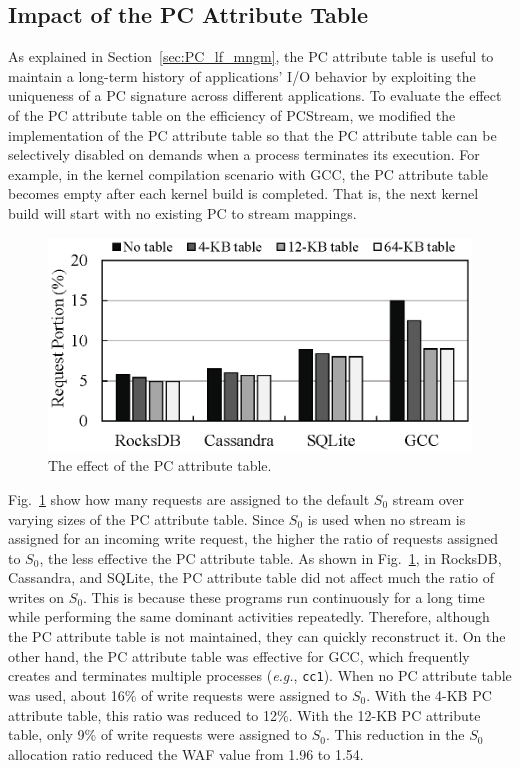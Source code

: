 \subsection{Impact of the PC Attribute Table}
As explained in Section~\ref{sec:PC_lf_mngm}, the PC attribute table is useful to maintain a
long-term history of applications' I/O behavior by exploiting the uniqueness of
a PC signature across different applications.   To evaluate the effect of the
PC attribute table on the efficiency of \textsf{\small PCStream}, we modified
the implementation of the PC attribute table so that the PC attribute table can
be selectively disabled on demands when a process terminates its execution.
For example, in the kernel compilation scenario with GCC, the PC attribute
table becomes empty after each kernel build is completed.  That is, the next
kernel build will start with no existing PC to stream mappings.


\begin{figure}[t]
	\centering
	\includegraphics[width=1\linewidth]{figure/pcstream/pctable}
	\caption{The effect of the PC attribute table.}
	\label{fig:pctable}
\end{figure}

Fig.~\ref{fig:pctable} show how many requests are assigned to the default
$S_{0}$ stream over varying sizes of the PC attribute table.  Since $S_{0}$ is
used when no stream is assigned for an incoming write request, the higher the
ratio of requests assigned to $S_{0}$, the less effective the PC attribute
table.   As shown in Fig.~\ref{fig:pctable}, in RocksDB, Cassandra, and SQLite,
the PC attribute table did not affect much the ratio of writes on $S_{0}$.
This is because these programs run continuously for a long time while
performing the same dominant activities repeatedly.  Therefore, although the PC
attribute table is not maintained, they can quickly reconstruct it.  On the
other hand, the PC attribute table was effective for GCC, which frequently
creates and terminates multiple processes ({\it e.g.}, {\tt cc1}).  When no PC
attribute table was used, about 16\% of write requests were assigned to
$S_{0}$.  With the 4-KB PC attribute table, this ratio was reduced to 12\%.
With the 12-KB PC attribute table, only 9\% of write requests were assigned to
$S_{0}$.  This reduction in the $S_{0}$ allocation ratio reduced the WAF value
from 1.96 to 1.54.


